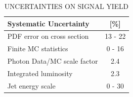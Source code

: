 \begin{table}
  \centering
  \caption{UNCERTAINTIES ON SIGNAL YIELD}
  \begin{tabular}{ | l | c | }
    \hline
    \hline
        Systematic Uncertainty & [\%] \\

    \hline
        PDF error on cross section & 13 - 22 \\
        Finite MC statistics & 0 - 16 \\
        Photon Data/MC scale factor & 2.4 \\                                                                                   
    	Integrated luminosity & 2.3 \\
    Jet energy scale & 0 - 30\\                                                                                                                      
    \hline
    \hline
  \end{tabular}
  \label{tab:SysUncert}
\end{table}


